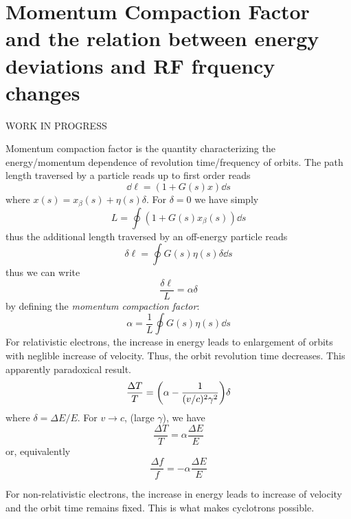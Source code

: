 \chapter{Momentum Compaction Factor and the relation between energy deviations and RF frquency changes}
WORK IN PROGRESS

Momentum compaction factor is the quantity characterizing the energy/momentum dependence of revolution time/frequency of orbits.
The path length traversed by a particle reads up to first order reads
\begin{equation}
    \dd \ell = (1 + G(s)x)\dd s
\end{equation}
where $x(s) = x_\beta(s) + \eta(s)\delta$. For $\delta = 0$ we have simply
$$L = \oint (1 + G(s)x_\beta(s))\dd{s}$$
thus the additional length traversed by an off-energy particle reads
\begin{equation}
    \delta\ell = \oint G(s)\eta(s)\delta \dd{s}
\end{equation}
thus we can write
$$\frac{\delta\ell}{L}=\alpha \delta$$
by defining the \textit{momentum compaction factor}:
\begin{equation}
    \alpha = \frac{1}{L}\oint G(s)\eta(s)\dd{s}
\end{equation}
For relativistic electrons, the increase in energy leads to enlargement of orbits with neglible increase of velocity. Thus, the orbit revolution time decreases. This apparently paradoxical result.
$$\frac{\Delta T}{T}=\qty(\alpha-\frac{1}{(v/c)^{2}\gamma^{2}})\delta$$
where $\delta = \Delta E/E$. For $v\to c$, (large $\gamma$), we have
$$\frac{\Delta T}{T}=\alpha \frac{\Delta E}{E}$$
or, equivalently
$$\frac{\Delta f}{f}=-\alpha \frac{\Delta E}{E}$$


For non-relativistic electrons, the increase in energy leads to increase of velocity and the orbit time remains fixed. This is what makes cyclotrons possible.
